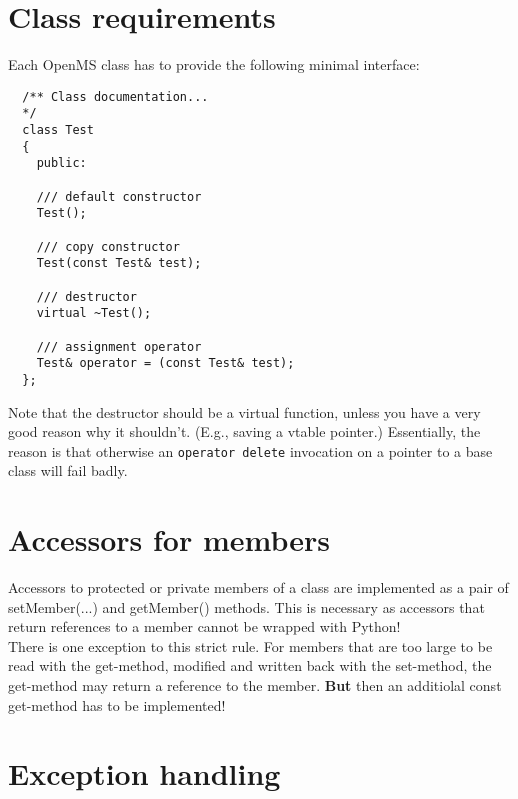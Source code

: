\documentclass[a4]{article}
\begin{document}
\section{Class requirements}

Each OpenMS class has to provide the following minimal interface:
\begin{verbatim}
  /** Class documentation... 
  */
  class Test
  {
    public:

    /// default constructor
    Test();

    /// copy constructor 
    Test(const Test& test);

    /// destructor 
    virtual ~Test();
 
    /// assignment operator
    Test& operator = (const Test& test);
  };
\end{verbatim}
Note that the destructor should be a virtual function, unless you have a very
good reason why it shouldn't.  (E.g., saving a vtable pointer.)  Essentially,
the reason is that otherwise an \texttt{operator delete} invocation on a
pointer to a base class will fail badly.

\section{Accessors for members}
Accessors to protected or private members of a class are implemented as a pair
of setMember(...) and getMember() methods.
This is necessary as accessors that return references to a member cannot be wrapped with Python!\\
There is one exception to this strict rule. For members that are too large to be
read with the get-method, modified and written back with the set-method, the
get-method may return a reference to the member. {\bf But} then an additiolal const
get-method has to be implemented! 

\section{Exception handling}
\end{document}
